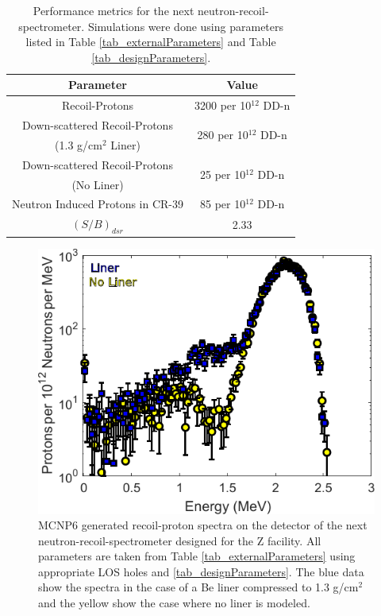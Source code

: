 \begin{table}[!h]
	\caption{Performance metrics for the next neutron-recoil-spectrometer. Simulations were done using parameters listed in Table \ref{tab_externalParameters} and Table \ref{tab_designParameters}.}
	\label{tab_performanceMetrics}
	\renewcommand{\arraystretch}{1.5}
	\centering
	\begin{tabular}{  c | c  }
		Parameter & Value \\\hline
		Recoil-Protons & 3200 per 10$^{12}$ DD-n \\ 
		Down-scattered Recoil-Protons & \multirow{2}{*}{280 per 10$^{12}$ DD-n} \\
		(1.3 g/cm$^2$ Liner) &\\
		Down-scattered Recoil-Protons & \multirow{2}{*}{25 per 10$^{12}$ DD-n} \\
		(No Liner) &\\
		Neutron Induced Protons in CR-39 & 85 per 10$^{12}$ DD-n \\
		$(S/B)_{dsr}$ & 2.33 \\
	\end{tabular}		
\end{table}

\begin{figure}[h!]
	
	\centering
	\includegraphics[scale=1.5]{Figures/finalSpectra.pdf}
	\caption{MCNP6 generated recoil-proton spectra on the detector of the next neutron-recoil-spectrometer designed for the Z facility. All parameters are taken from Table \ref{tab_externalParameters} using appropriate LOS holes and \ref{tab_designParameters}. The blue data show the spectra in the case of a Be liner compressed to 1.3 g/cm$^2$ and the yellow show the case where no liner is modeled.}
	\label{fig_finalSpectra}
	
\end{figure}

